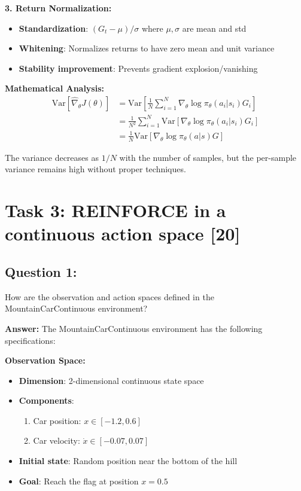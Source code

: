 \documentclass[12pt]{article}
\begin{document}
{{{\textbf{3. Return Normalization:}
\begin{itemize}
    \item \textbf{Standardization}: $(G_t - \mu)/\sigma$ where $\mu, \sigma$ are mean and std
    \item \textbf{Whitening}: Normalizes returns to have zero mean and unit variance
    \item \textbf{Stability improvement}: Prevents gradient explosion/vanishing
\end{itemize}

\textbf{Mathematical Analysis:}
\begin{align}
\text{Var}[\hat{\nabla}_\theta J(\theta)] &= \text{Var}\left[\frac{1}{N} \sum_{i=1}^{N} \nabla_\theta \log \pi_\theta(a_i|s_i) G_i\right] \\
&= \frac{1}{N^2} \sum_{i=1}^{N} \text{Var}[\nabla_\theta \log \pi_\theta(a_i|s_i) G_i] \\
&= \frac{1}{N} \text{Var}[\nabla_\theta \log \pi_\theta(a|s) G]
\end{align}

The variance decreases as $1/N$ with the number of samples, but the per-sample variance remains high without proper techniques.

\newpage

\section{Task 3: REINFORCE in a continuous action space [20]}

\subsection{Question 1:}

How are the observation and action spaces defined in the MountainCarContinuous environment?
\vspace*{0.3cm}

\textbf{Answer:} The MountainCarContinuous environment has the following specifications:

\textbf{Observation Space:}
\begin{itemize}
    \item \textbf{Dimension}: 2-dimensional continuous state space
    \item \textbf{Components}:
    \begin{enumerate}
        \item Car position: $x \in [-1.2, 0.6]$
        \item Car velocity: $\dot{x} \in [-0.07, 0.07]$
    \end{enumerate}
    \item \textbf{Initial state}: Random position near the bottom of the hill
    \item \textbf{Goal}: Reach the flag at position $x = 0.5$
\end{itemize}

}}}
\end{document}
